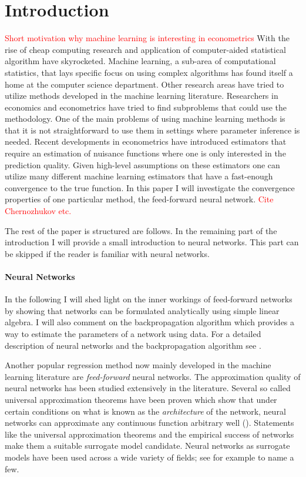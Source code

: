 \section{Introduction}

\textcolor{red}{Short motivation why machine learning is interesting in econometrics}
With the rise of cheap computing research and application of computer-aided statistical
algorithm have skyrocketed. Machine learning, a sub-area of computational statistics,
that lays specific focus on using complex algorithms has found itself a home at the
computer science department. Other research areas have tried to utilize methods
developed in the machine learning literature. Researchers in economics and econometrics
have tried to find subproblems that could use the methodology. One of the main problems
of using machine learning methods is that it is not straightforward to use them in
settings where parameter inference is needed. Recent developments in econometrics have
introduced estimators that require an estimation of nuisance functions where one is only
interested in the prediction quality. Given high-level assumptions on these estimators
one can utilize many different machine learning estimators that have a fast-enough
convergence to the true function. In this paper I will investigate the convergence
properties of one particular method, the feed-forward neural network.
\textcolor{red}{Cite Chernozhukov etc.}

The rest of the paper is structured are follows. In the remaining part of the
introduction I will provide a small introduction to neural networks. This part can be
skipped if the reader is familiar with neural networks.

\paragraph{Neural Networks}

In the following I will shed light on the inner workings of feed-forward networks by
showing that networks can be formulated analytically using simple linear algebra. I will
also comment on the backpropagation algorithm which provides a way to estimate the
parameters of a network using data. For a detailed description of neural networks and
the backpropagation algorithm see \cite{Goodfellow.2016, Murphy.2012, Hastie.2008}.

Another popular regression method now mainly developed in the machine learning
literature are \emph{feed-forward} neural networks. The approximation quality of neural
networks has been studied extensively in the literature. Several so called universal
approximation theorems have been proven which show that under certain conditions on what
is known as the \emph{architecture} of the network, neural networks can approximate any
continuous function arbitrary well (\cite{Hornik.1991}). Statements like the universal
approximation theorems and the empirical success of networks make them a suitable
surrogate model candidate. Neural networks as surrogate models have been used across a
wide variety of fields; see for example \cite{Holena.2010, Gang.2019, Tripathy.2018} to
name a few.

